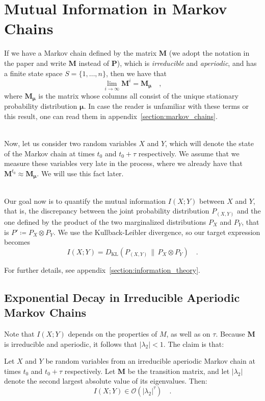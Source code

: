 \documentclass[../../main.tex]{subfiles}
\begin{document}
\section{Mutual Information in Markov Chains}
\label{sec:mutual_information_in_markov_chains}
    If we have a Markov chain defined by the matrix $\boldsymbol{M}$ (we adopt the notation in the paper and write $\bm{M}$ instead of $\bm{P}$), which is \emph{irreducible} and \emph{aperiodic}, and has a finite state space $S = \{1, \dots, n\}$, then we have that
    \[
        \lim_{i \to \infty} \boldsymbol{M}^i = \boldsymbol{M}_{\boldsymbol{\mu}} \quad ,
    \]
    where $\boldsymbol{M_\mu}$ is the matrix whose columns all consist of the unique stationary probability distribution $\boldsymbol{\mu}$. In case the reader is unfamiliar with these terms or this result, one can read them in appendix~\ref{section:markov_chains}.

    ~\\
    Now, let us consider two random variables $X$ and $Y$, which will denote the state of the Markov chain at times $t_0$ and $t_0 + \tau$ respectively. We assume that we measure these variables very late in the process, where we already have that $\boldsymbol{M}^{t_0} \approx \boldsymbol{M}_{\boldsymbol{\mu}}$. We will use this fact later.

    ~\\
    Our goal now is to quantify the mutual information $I(X;Y)$ between $X$ and $Y$, that is, the discrepancy between the joint probability distribution $P_{(X, Y)}$ and the one defined by the product of the two marginalized distributions $P_X$ and $P_Y$, that is $P' \coloneqq P_X \otimes P_Y$. We use the Kullback-Leibler divergence, so our target expression becomes
    \[
        I(X;Y) = D_{\mathrm{KL}}(P_{(X, Y)} \,\|\, P_X \otimes P_Y) \quad .
    \]

    For further details, see appendix~\ref{section:information_theory}.

    \smallskip \noindent
    \subsection{Exponential Decay in Irreducible Aperiodic Markov Chains}
    Note that $I(X; Y)$ depends on the properties of $M$, as well as on $\tau$. Because $\boldsymbol{M}$ is irreducible and aperiodic, it follows that $|\lambda_2| < 1$. The claim is that:

    \begin{theorem}
        \label{theorem:no_power-law_in_irreducible_aperdioc_markov_chains}
        Let $X$ and $Y$ be random variables from an irreducible aperiodic Markov chain at times $t_0$ and $t_0 + \tau$ respectively. Let $\bm{M}$ be the transition matrix, and let $|\lambda_2|$ denote the second largest absolute value of its eigenvalues. Then:
        \[
            I(X; Y) \in \mathcal{O}(|\lambda_2|^\tau) \quad .
        \]
    \end{theorem}
    
\end{document}
